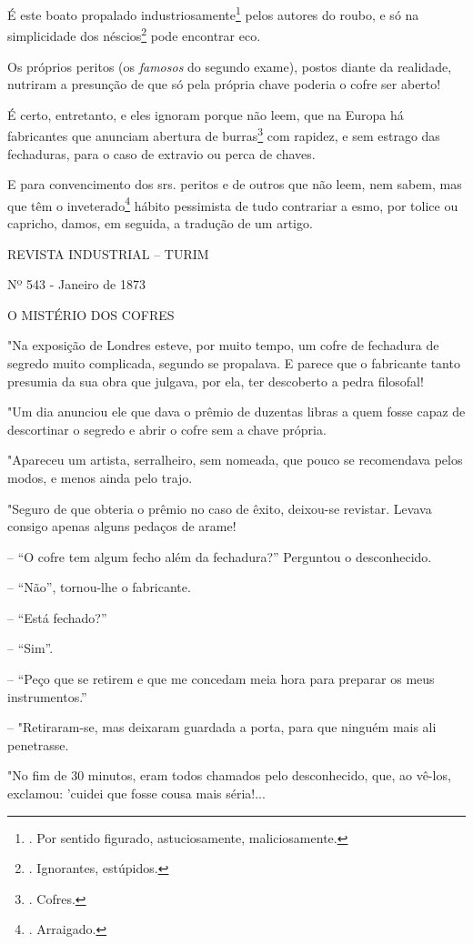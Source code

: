 É este boato propalado industriosamente\footnote{. Por sentido figurado,
  astuciosamente, maliciosamente.} pelos autores do roubo, e só na
simplicidade dos néscios\footnote{. Ignorantes, estúpidos.} pode
encontrar eco.

Os próprios peritos (os \emph{famosos} do segundo exame), postos diante
da realidade, nutriram a presunção de que só pela própria chave poderia
o cofre ser aberto!

É certo, entretanto, e eles ignoram porque não leem, que na Europa há
fabricantes que anunciam abertura de burras\footnote{. Cofres.} com
rapidez, e sem estrago das fechaduras, para o caso de extravio ou perca
de chaves.

E para convencimento dos srs. peritos e de outros que não leem, nem
sabem, mas que têm o inveterado\footnote{. Arraigado.} hábito pessimista
de tudo contrariar a esmo, por tolice ou capricho, damos, em seguida, a
tradução de um artigo.

REVISTA INDUSTRIAL -- TURIM

Nº 543 - Janeiro de 1873

O MISTÉRIO DOS COFRES

"Na exposição de Londres esteve, por muito tempo, um cofre de fechadura
de segredo muito complicada, segundo se propalava. E parece que o
fabricante tanto presumia da sua obra que julgava, por ela, ter
descoberto a pedra filosofal!

"Um dia anunciou ele que dava o prêmio de duzentas libras a quem fosse
capaz de descortinar o segredo e abrir o cofre sem a chave própria.

"Apareceu um artista, serralheiro, sem nomeada, que pouco se recomendava
pelos modos, e menos ainda pelo trajo.

"Seguro de que obteria o prêmio no caso de êxito, deixou-se revistar.
Levava consigo apenas alguns pedaços de arame!

-- ``O cofre tem algum fecho além da fechadura?'' Perguntou o
desconhecido.

-- ``Não'', tornou-lhe o fabricante.

-- ``Está fechado?''

-- ``Sim''.

-- ``Peço que se retirem e que me concedam meia hora para preparar os
meus instrumentos.''

-- "Retiraram-se, mas deixaram guardada a porta, para que ninguém mais
ali penetrasse.

"No fim de 30 minutos, eram todos chamados pelo desconhecido, que, ao
vê-los, exclamou: 'cuidei que fosse cousa mais séria!...

